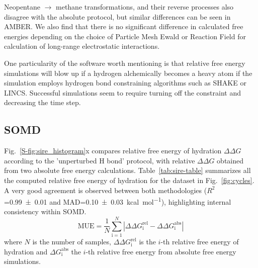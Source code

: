 \documentclass[journal=jctcce,manuscript=article]{achemso}
\begin{document}
Neopentane $\rightarrow$ methane transformations, and their reverse processes 
also disagree with the absolute protocol, but similar differences can be seen in AMBER.
We also find that there is no significant difference in calculated free energies depending on the choice of 
Particle Mesh Ewald or Reaction Field for calculation of long-range electrostatic interactions. 

One particularity of the software worth mentioning is 
that relative free energy simulations will blow up if a hydrogen alchemically becomes a heavy 
atom if the simulation employs hydrogen bond constraining algorithms such as SHAKE or LINCS.
Successful simulations seem to require turning off the constraint and decreasing the time step.

\subsection{SOMD}
\label{sec:somd-results}

Fig.~\ref{S-fig:sire_histogram}x compares relative free energy of hydration 
$\Delta\Delta G$ according to the 'unperturbed H bond' protocol, with relative 
$\Delta \Delta G$ obtained from two absolute free energy calculations. 
Table~\ref{tab:sire-table} summarizes all the computed relative free energy of 
hydration for the dataset in Fig.~\ref{fig:cycles}.
A very good agreement is observed between both methodologies 
($R^2$=\SI{0.99+-0.01}{} and 
MAD=\SI{0.10+-0.03}{kcal.mol^{-1}}), highlighting internal consistency within 
SOMD.
\begin{equation}
 \label{eq:MUE}
 \mathrm{MUE} = \frac{1}{N}\sum_\mathrm{i=1}^N \left | \Delta\Delta 
 G^\mathrm{rel}_\mathrm{i} - \Delta\Delta G^\mathrm{abs}_\mathrm{i} \right |
\end{equation}
where $N$ is the number of samples, $\Delta\Delta G^\mathrm{rel}_\mathrm{i}$ is the $i$-th relative free energy of hydration and  $\Delta G^\mathrm{abs}_\mathrm{i}$ the $i$-th relative free energy from absolute free energy simulations.
\end{document}
